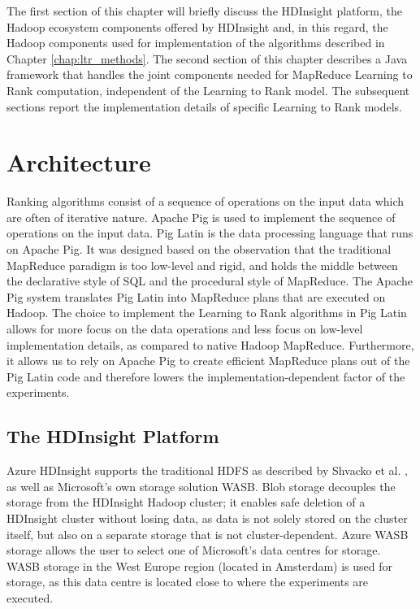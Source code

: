 \label{chap:implementation}
The first section of this chapter will briefly discuss the HDInsight platform, the Hadoop ecosystem components offered by HDInsight and, in this regard, the Hadoop components used for implementation of the algorithms described in Chapter \ref{chap:ltr_methods}. The second section of this chapter describes a Java framework that handles the joint components needed for MapReduce Learning to Rank computation, independent of the Learning to Rank model. The subsequent sections report the implementation details of specific Learning to Rank models.

\section{Architecture}
Ranking algorithms consist of a sequence of operations on the input data which are often of iterative nature. Apache Pig \cite{Olston2008} is used to implement the sequence of operations on the input data. Pig Latin is the data processing language that runs on Apache Pig. It was designed based on the observation that the traditional MapReduce paradigm is too low-level and rigid, and holds the middle between the declarative style of SQL and the procedural style of MapReduce. The Apache Pig system translates Pig Latin into MapReduce plans that are executed on Hadoop. The choice to implement the Learning to Rank algorithms in Pig Latin allows for more focus on the data operations and less focus on low-level implementation details, as compared to native Hadoop MapReduce. Furthermore, it allows us to rely on Apache Pig to create efficient MapReduce plans out of the Pig Latin code and therefore lowers the implementation-dependent factor of the experiments.\\

\subsection{The HDInsight Platform}
Azure HDInsight supports the traditional \ac{HDFS} as described by Shvacko et al. \cite{Shvachko2010}, as well as Microsoft's own storage solution \ac{WASB}. Blob storage decouples the storage from the HDInsight Hadoop cluster; it enables safe deletion of a HDInsight cluster without losing data, as data is not solely stored on the cluster itself, but also on a separate storage that is not cluster-dependent. Azure \ac{WASB} storage allows the user to select one of Microsoft's data centres for storage. \ac{WASB} storage in the West Europe region (located in Amsterdam) is used for storage, as this data centre is located close to where the experiments are executed.\\

